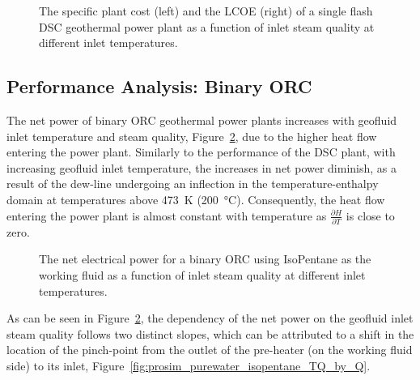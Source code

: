     \begin{figure}[H]
        \centering
        
        \caption[The specific plant cost (left) and the LCOE (right) of the single flash \ac{DSC} geothermal power plant.]{The specific plant cost (left) and the LCOE (right) of a single flash \ac{DSC} geothermal power plant as a function of inlet steam quality at different inlet temperatures.}
        \label{fig:prosim_purewater_DSC_costs}
    \end{figure}

\subsection{Performance Analysis: Binary ORC}
    \label{sec:ORC_thermo_opt}

    The net power of binary \ac{ORC} geothermal power plants increases with geofluid inlet temperature and steam quality, Figure~\ref{fig:prosim_purewater_isopentane_by_temp}, due to the higher heat flow entering the power plant. Similarly to the performance of the \ac{DSC} plant, with increasing geofluid inlet temperature, the increases in net power diminish, as a result of the dew-line undergoing an inflection in the temperature-enthalpy domain at temperatures above \qty{473}{\K} (\qty{200}{\degreeCelsius}). Consequently, the heat flow entering the power plant is almost constant with temperature as \(\frac{\partial H}{\partial T}\) is close to zero. 
    
    \begin{figure}[H]
        \centering
        
        \caption[The net electrical power for a binary \ac{ORC} using IsoPentane as the working fluid.]{The net electrical power for a binary \ac{ORC} using IsoPentane as the working fluid as a function of inlet steam quality at different inlet temperatures.}
        \label{fig:prosim_purewater_isopentane_by_temp}
    \end{figure}

    As can be seen in Figure~\ref{fig:prosim_purewater_isopentane_by_temp}, the dependency of the net power on the geofluid inlet steam quality follows two distinct slopes, which can be attributed to a shift in the location of the pinch-point from the outlet of the pre-heater (on the working fluid side) to its inlet, Figure~\ref{fig:prosim_purewater_isopentane_TQ_by_Q}. 
    
